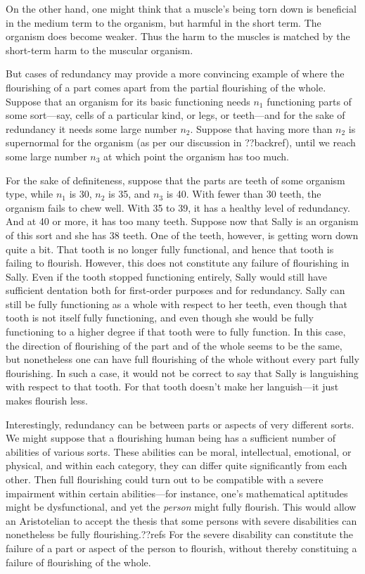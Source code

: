 On the other hand, one might think that a muscle's being torn down is beneficial in the medium term to the organism,
but harmful in the short term. The organism does become weaker. Thus the harm to the muscles is matched by the 
short-term harm to the muscular organism.

But cases of redundancy may provide a more convincing example of where the flourishing of a part comes apart from
the partial flourishing of the whole. Suppose that an organism for its basic functioning needs $n_1$ functioning parts of some sort---say,
cells of a particular kind, or legs, or teeth---and for the sake of redundancy it needs some large number $n_2$.
Suppose that having more than $n_2$ is supernormal for the organism (as per our discussion in ??backref), until we
reach some large number $n_3$ at which point the organism has too much.  

For the sake of definiteness, suppose that the parts are teeth of some organism type, while $n_1$ is 30, $n_2$ is 35, and $n_3$ is 40. With fewer
than 30 teeth, the organism fails to chew well. With 35 to 39, it has a healthy level of redundancy. And at 40 or more,
it has too many teeth. Suppose now that Sally is an organism of this sort and she has 38 teeth. One of the teeth, however,
is getting worn down quite a bit. That tooth is no longer fully functional, and hence that tooth is failing to flourish.
However, this does not constitute any failure of flourishing in Sally. Even if the tooth stopped functioning entirely,
Sally would still have sufficient dentation both for first-order purposes and for redundancy. Sally can still be fully
functioning as a whole with respect to her teeth, even though that tooth is not itself fully functioning, and even though
she would be fully functioning to a higher degree if that tooth were to fully function. In this case, the direction of
flourishing of the part and of the whole seems to be the same, but nonetheless one can have full flourishing of the whole
without every part fully flourishing. In such a case, it would not be correct to say that Sally is languishing with respect
to that tooth. For that tooth doesn't make her languish---it just makes flourish less.

Interestingly, redundancy can be between parts or aspects of very different sorts. We might suppose that a flourishing human 
being has a sufficient number of abilities of various sorts. These abilities can be moral, intellectual, emotional, or physical, and
within each category, they can differ quite significantly from each other. Then full flourishing could turn out to be compatible with a severe
impairment within certain abilities---for instance, one's mathematical aptitudes might be dysfunctional, and yet the \textit{person} 
might fully flourish. This would allow an Aristotelian to accept the thesis that some persons with severe disabilities can nonetheless
be fully flourishing.??refs For the severe disability can constitute the failure of a part or aspect of the person to flourish, without
thereby constituing a failure of flourishing of the whole. 

